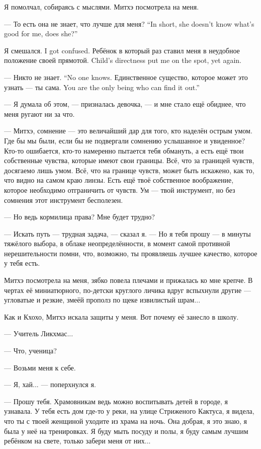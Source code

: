 Я помолчал, собираясь с мыслями.
Митхэ посмотрела на меня.

{--- То есть она не знает, что лучше для меня?}
{``In short, she doesn't know what's good for me, does she?''}

{Я смешался.}
{I got confused.}
{Ребёнок в который раз ставил меня в неудобное положение своей прямотой.}
{Child's directness put me on the spot, yet again.}

{--- Никто не знает.}
{``No one knows.}
{Единственное существо, которое может это узнать --- ты сама.}
{You are the only being who can find it out.''}

--- Я думала об этом, --- призналась девочка, --- и мне стало ещё обиднее, что меня ругают ни за что.

--- Митхэ, сомнение --- это величайший дар для того, кто наделён острым умом.
Где бы мы были, если бы не подвергали сомнению услышанное и увиденное?
Кто-то ошибается, кто-то намеренно пытается тебя обмануть, а есть ещё твои собственные чувства, которые имеют свои границы.
Всё, что за границей чувств, досягаемо лишь умом.
Всё, что на границе чувств, может быть искажено, как то, что видно на самом краю линзы.
Есть ещё твоё собственное воображение, которое необходимо отграничить от чувств.
Ум --- твой инструмент, но без сомнения этот инструмент бесполезен.

--- Но ведь кормилица права?
Мне будет трудно?

--- Искать путь --- трудная задача, --- сказал я.
--- Но я тебя прошу --- в минуты тяжёлого выбора, в облаке неопределённости, в момент самой противной нерешительности помни, что, возможно, ты проявляешь лучшее качество, которое у тебя есть.

Митхэ посмотрела на меня, зябко повела плечами и прижалась ко мне крепче.
В чертах её миниатюрного, по-детски круглого личика вдруг вспыхнули другие --- угловатые и резкие, змеёй прополз по щеке извилистый шрам...

Как и Кхохо, Митхэ искала защиты у меня.
Вот почему её занесло в школу.

--- Учитель Ликхмас...

--- Что, ученица?

--- Возьми меня к себе.

--- Я, хай... --- поперхнулся я.

--- Прошу тебя.
Храмовникам ведь можно воспитывать детей в городе, я узнавала.
У тебя есть дом где-то у реки, на улице Стриженого Кактуса, я видела, что ты с твоей женщиной уходите из храма на ночь.
Она добрая, я это знаю, я была у неё на тренировках.
Я буду мыть посуду и полы, я буду самым лучшим ребёнком на свете, только забери меня от них...

